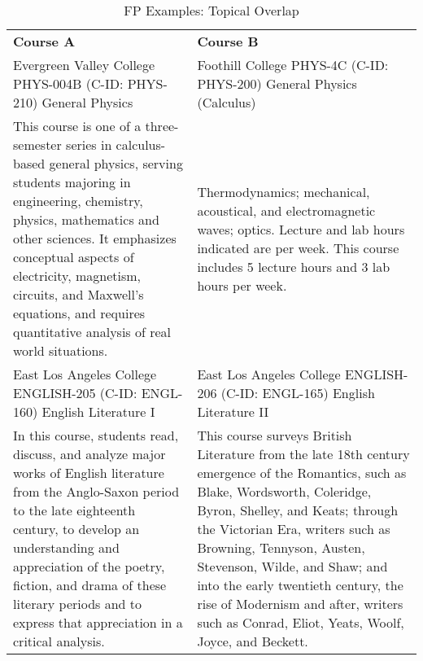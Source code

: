 \begin{longtable}{ >{\baselineskip=12pt}p{} >{\baselineskip=12pt}p{} }
\captionsetup{skip=5pt}
\caption{FP Examples: Topical Overlap}\label{tab:fp_overlap}\\
\bottomrule\toprule
\textbf{\textbf{Course A}} & \textbf{\textbf{Course B}} \\
\bottomrule\toprule
\endhead
Evergreen Valley College \newline PHYS-004B (C-ID: PHYS-210) \newline General Physics & Foothill College \newline PHYS-4C (C-ID: PHYS-200) \newline General Physics (Calculus) \\
\midrule
This course is one of a three-semester series in calculus-based general physics, serving students majoring in engineering, chemistry, physics, mathematics and other sciences. It emphasizes conceptual aspects of electricity, magnetism, circuits, and Maxwell's equations, and requires quantitative analysis of real world situations. & Thermodynamics; mechanical, acoustical, and electromagnetic waves; optics. Lecture and lab hours indicated are per week. This course includes 5 lecture hours and 3 lab hours per week. \\
\bottomrule\toprule
East Los Angeles College \newline ENGLISH-205 (C-ID: ENGL-160) \newline English Literature I & East Los Angeles College \newline ENGLISH-206 (C-ID: ENGL-165) \newline English Literature II \\
\midrule
In this course, students read, discuss, and analyze major works of English literature from the Anglo-Saxon period to the late eighteenth century, to develop an understanding and appreciation of the poetry, fiction, and drama of these literary periods and to express that appreciation in a critical analysis. & This course surveys British Literature from the late 18th century emergence of the Romantics, such as Blake, Wordsworth, Coleridge, Byron, Shelley, and Keats; through the Victorian Era, writers such as Browning, Tennyson, Austen, Stevenson, Wilde, and Shaw; and into the early twentieth century, the rise of Modernism and after, writers such as Conrad, Eliot, Yeats, Woolf, Joyce, and Beckett. \\
\bottomrule\toprule

\end{longtable}
